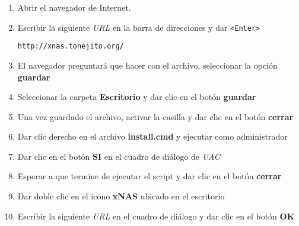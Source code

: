 {
\linespread{0.1}
\begin{enumerate}


  \item Abrir el navegador de Internet.


  \item Escribir la siguiente \textit{URL} en la barra de direcciones y dar \texttt{<Enter>}

  \texttt{http://xnas.tonejito.org/}


  \item El navegador preguntar\'{a} que hacer con el archivo, seleccionar la opci\'{o}n \textbf{guardar}


  \item Seleccionar la carpeta \textbf{Escritorio} y dar clic en el bot\'{o}n \textbf{guardar}


  \item Una vez guardado el archivo, activar la casilla y dar clic en el bot\'{o}n \textbf{cerrar}


  \item Dar clic derecho en el archivo \textbf{install.cmd} y ejecutar como administrador


  \item Dar clic en el bot\'{o}n \textbf{SI} en el cuadro de di\'{a}logo de \textit{UAC}


  \item Esperar a que termine de ejecutar el script y dar clic en el bot\'{o}n \textbf{cerrar}


  \item Dar doble clic en el icono \textbf{xNAS} ubicado en el escritorio


  \item Escribir la siguiente \textit{URL} en el cuadro de di\'{a}logo y dar clic en el bot\'{o}n \textbf{OK}


\end{enumerate}}
